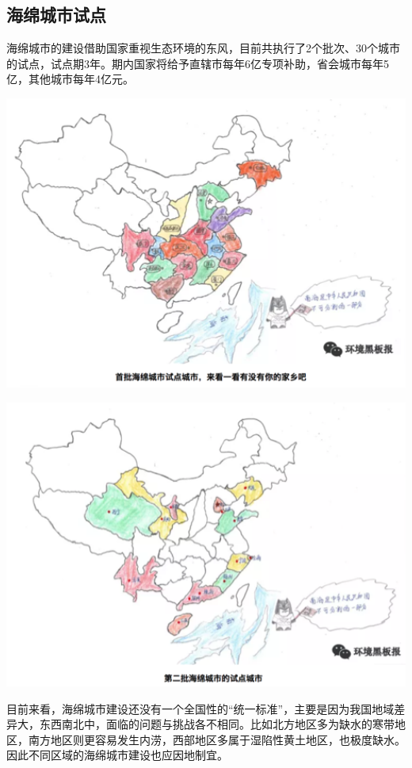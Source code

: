 \documentclass[]{book}
\begin{document}
\subsection{海绵城市试点}

海绵城市的建设借助国家重视生态环境的东风，目前共执行了2个批次、30个城市的试点，试点期3年。期内国家将给予直辖市每年6亿专项补助，省会城市每年5亿，其他城市每年4亿元。

\includegraphics[width=6.67in]{images/ch5}

\includegraphics[width=6.67in]{images/ch6}

目前来看，海绵城市建设还没有一个全国性的``统一标准''，主要是因为我国地域差异大，东西南北中，面临的问题与挑战各不相同。比如北方地区多为缺水的寒带地区，南方地区则更容易发生内涝，西部地区多属于湿陷性黄土地区，也极度缺水。因此不同区域的海绵城市建设也应因地制宜。
\end{document}
